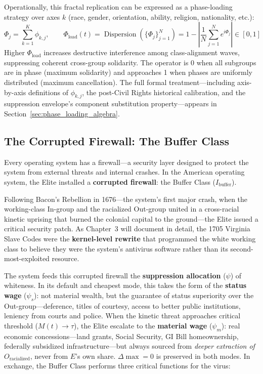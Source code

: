 \documentclass[12pt,openany]{book}
\begin{document}
Operationally, this fractal replication can be expressed as a phase-loading strategy over axes $k$ (race, gender, orientation, ability, religion, nationality, etc.):
\[
\Phi_j = \sum_{k=1}^{K} \phi_{k,j}, \qquad
\Phi_{\text{load}}(t) = \operatorname{Dispersion}\!\left(\{\Phi_j\}_{j=1}^{N}\right) = 1 - \left|\frac{1}{N}\sum_{j=1}^{N} e^{i\Phi_j}\right| \in [0,1]
\]
Higher $\Phi_{\text{load}}$ increases destructive interference among class-alignment waves, suppressing coherent cross-group solidarity. The operator is 0 when all subgroups are in phase (maximum solidarity) and approaches 1 when phases are uniformly distributed (maximum cancellation). The full formal treatment---including axis-by-axis definitions of $\phi_{k,j}$, the post-Civil Rights historical calibration, and the suppression envelope's component substitution property---appears in Section~\ref{sec:phase_loading_algebra}.

\subsection{The Corrupted Firewall: The Buffer Class}

Every operating system has a firewall---a security layer designed to protect the system from external threats and internal crashes. In the American operating system, the Elite installed a \textbf{corrupted firewall}: the Buffer Class ($I_{\text{buffer}}$).

Following Bacon's Rebellion in 1676---the system's first major crash, when the working-class In-group and the racialized Out-group united in a cross-racial kinetic uprising that burned the colonial capital to the ground---the Elite issued a critical security patch. As Chapter~3 will document in detail, the 1705 Virginia Slave Codes were the \textbf{kernel-level rewrite} that programmed the white working class to believe they were the system's antivirus software rather than its second-most-exploited resource.

The system feeds this corrupted firewall the \textbf{suppression allocation} ($\psi$) of whiteness. In its default and cheapest mode, this takes the form of the \textbf{status wage} ($\psi_s$): not material wealth, but the guarantee of status superiority over the Out-group---deference, titles of courtesy, access to better public institutions, leniency from courts and police. When the kinetic threat approaches critical threshold ($M(t) \to \tau$), the Elite escalate to the \textbf{material wage} ($\psi_m$): real economic concessions---land grants, Social Security, GI Bill homeownership, federally subsidized infrastructure---but always sourced from \textit{deeper extraction of $O_{\text{racialized}}$}, never from $E$'s own share. $\Delta\max = 0$ is preserved in both modes. In exchange, the Buffer Class performs three critical functions for the virus:
\end{document}

